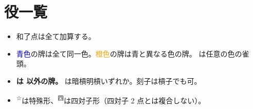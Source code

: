 \documentclass[
	line_length=40zw,
	head_space=2cm,
	foot_space=1cm,
	landscape,
	twocolumn,
	column_gap=1zw,
]{jlreq}
\newcommand{\特殊}{\textsuperscript ☆}
\newcommand{\四対子}{\textsuperscript 四}
\begin{document}
\section{役一覧}
\begin{itemize}
	\item 和了点は全て加算する。
	\item \textcolor{blue}{青色}の牌は全て同一色。\textcolor{orange}{橙色}の牌は青と異なる色の牌。
		\xq*{3}{?} は任意の色の雀頭。
	\item \textbf{ は  以外の牌。}
		\xq*{B}{A}は暗槓明槓いずれか。刻子は槓子でも可。
	\item \特殊 は特殊形、\四対子 は四対子形（四対子 2 点とは複合しない）。
\end{itemize}
\end{document}
